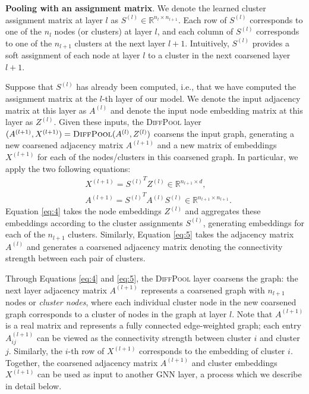\documentclass{article}
\newcommand{\xhdr}[1]{{\noindent\bfseries #1}.}
\newcommand{\name}{\textsc{DiffPool}\xspace}
\begin{document}
\xhdr{Pooling with an assignment matrix}
We denote the learned cluster assignment matrix at layer $l$ as $S^{(l)} \in \mathbb{R}^{n_l \times n_{l+1}}$. 
Each row of $S^{(l)}$ corresponds to one of the $n_l$ nodes (or clusters) at layer $l$, and each column of $S^{(l)}$ corresponds to one of the $n_{l+1}$ clusters at the next layer $l+1$. 
Intuitively, $S^{(l)}$ provides a soft assignment of each node at layer $l$ to a cluster in the next coarsened layer $l+1$.

Suppose that $S^{(l)}$ has already been computed, i.e., that we have computed the assignment matrix at the $l$-th layer of our model.
We denote the input adjacency matrix at this layer as $A^{(l)}$ and denote the input node embedding matrix at this layer as $Z^{(l)}$.
Given these inputs, the \name layer $(A^{(l+1)},X^{(l+1)}) = \textsc{DiffPool}(A^{(l)},Z^{(l)})$ coarsens the input graph, generating a new coarsened adjacency matrix $A^{(l+1)}$ and a new matrix of embeddings $X^{(l+1)}$ for each of the nodes/clusters in this coarsened graph.
In particular, we apply the two following equations:
\begin{align}
\label{eq:4}
&X^{(l+1)} = {S^{(l)}}^T Z^{(l)}\in \mathbb{R}^{n_{l+1} \times d},\\
\label{eq:5}
&A^{(l+1)} = {S^{(l)}}^T A^{(l)}{S^{(l)}} \in \mathbb{R}^{n_{l+1} \times n_{l+1}}.
\end{align}
Equation \eqref{eq:4} takes the node embeddings $Z^{(l)}$ and aggregates these embeddings according to the cluster assignments $S^{(l)}$, generating embeddings for each of the $n_{l+1}$ clusters.
Similarly, Equation \eqref{eq:5} takes the adjacency matrix $A^{(l)}$ and generates a coarsened adjacency matrix denoting the connectivity strength between each pair of clusters. 

Through Equations \eqref{eq:4} and \eqref{eq:5}, the \name layer coarsens the graph: the next layer adjacency matrix $A^{(l+1)}$ represents a coarsened graph with $n_{l+1}$ nodes or {\em cluster nodes}, where each individual cluster node in the new coarsened graph corresponds to a cluster of nodes in the graph at layer $l$.
Note that $A^{(l+1)}$ is a real matrix and represents a fully connected edge-weighted  graph; each entry $A^{(l+1)}_{ij}$ can be viewed as the connectivity strength between cluster $i$ and cluster $j$. 
Similarly, the $i$-th row of $X^{(l+1)}$ corresponds to the embedding of cluster $i$. 
Together, the coarsened adjacency matrix $A^{(l+1)}$ and cluster embeddings $X^{(l+1)}$ can be used as input to another GNN layer, a process which we describe in detail below.  
\end{document}
